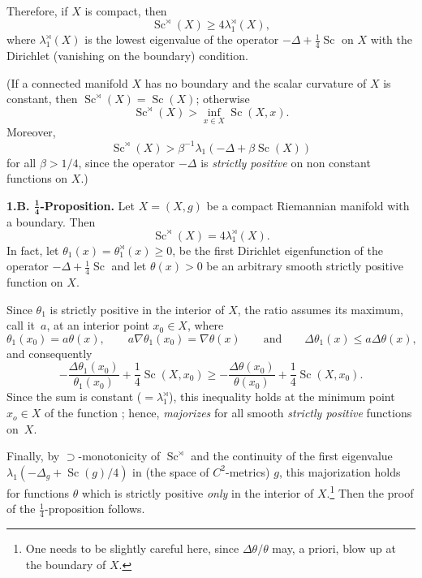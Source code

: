 \documentclass[pdftex]{sigma}
\numberwithin{equation}{section}
\begin{document}
 Therefore, if $X$ is compact, then
\[
\operatorname{Sc}^\rtimes (X)\geq 4\lambda_1^\rtimes(X),
\]
where $\lambda^\rtimes_1(X)$ is the lowest eigenvalue of the operator
$-\Delta +\frac {1}{4}\operatorname{Sc}$ on $X$ with the Dirichlet (vanishing on the boundary) condition.

(If a connected manifold $X$
has no boundary and the scalar curvature of $X$ is constant,
then $\operatorname{Sc}^\rtimes (X)=\operatorname{Sc}(X)$; otherwise
\[
\operatorname{Sc}^\rtimes (X)> \inf_{x\in X}\operatorname{Sc}(X,x).
\]
 Moreover,
\[
\operatorname{Sc}^\rtimes (X)>\beta^{-1} \lambda_1\left(-\Delta +\beta \operatorname{Sc}(X)\right)
\]
 for all $\beta>1/4$, since the operator $-\Delta$ is
{\it strictly positive} on non constant functions on $X$.)

\textbf{1.B. $\boldsymbol{\frac {1}{4}}$-Proposition.} Let $X=(X,g)$ be a compact Riemannian manifold with a boundary. Then
\[
\operatorname{Sc}^\rtimes (X)= 4\lambda_1^\rtimes(X).
\]
In fact, let $\theta_1(x)=\theta^\rtimes_1(x)\geq 0$, be the first Dirichlet eigenfunction of the operator $-\Delta +\frac {1}{4}\operatorname{Sc}$ and
let $\theta(x)>0$ be an arbitrary smooth strictly positive function on $X$.

Since $\theta_1$ is strictly positive in the interior of $X$,
the ratio  assumes its maximum, call it~$a$, at an interior point $x_0\in X$, where
\[
\theta_1(x_0)=a\theta(x), \qquad a \nabla\theta_1(x_0)= \nabla\theta(x) \qquad \text{and} \qquad \Delta\theta_1(x)\leq a\Delta\theta(x),
\]
and consequently
\[
-\frac{\Delta\theta_1(x_0)} {\theta_1(x_0)}+\frac14 \operatorname{Sc}(X,x_0)\geq -\frac{\Delta\theta(x_0)} {\theta(x_0)}+\frac14 \operatorname{Sc}(X,x_0).
\]
Since the sum  is constant ($=\lambda_1^\rtimes$), this
inequality holds at the minimum point $x_o\in X$ of the function
 ; hence,
 {\it majorizes}  for all smooth {\it strictly positive} functions on~$X$.

Finally, by {\large$\supset$}-monotonicity of $\operatorname{Sc}^\rtimes$ and the continuity of the first eigenvalue $\lambda_1(-\Delta_g + \operatorname{Sc}(g)/4)$ in (the space of $C^2$-metrics) $g$, this majorization holds for functions $\theta$ which is strictly positive {\it only} in the interior of $X$.\footnote {One needs to be slightly careful here, since
$\Delta \theta/\theta$ may, a priori, blow up at the boundary of $X$.} Then
the proof of the $\frac {1}{4}$-proposition follows.
\end{document}
